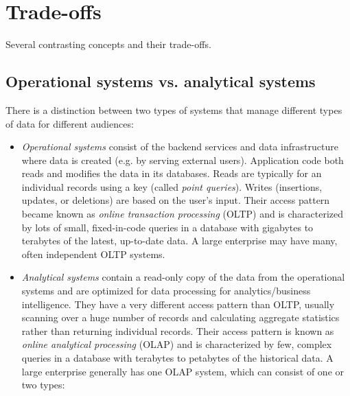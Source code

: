 \documentclass[table, xcdraw]{article}%
\begin{document}
\section{Trade-offs}

Several contrasting concepts and their trade-offs.

\subsection{Operational systems vs. analytical systems}

There is a distinction between two types of systems that manage different types of data for different audiences:
    
\begin{itemize}
    \item \textit{Operational systems} consist of the backend services and data infrastructure where data is created (e.g. by serving external users). Application code both reads and modifies the data in its databases. Reads are typically for an individual records using a key (called \textit{point queries}). Writes (insertions, updates, or deletions) are based on the user's input. Their access pattern became known as \textit{online transaction processing} (OLTP) and is characterized by lots of small, fixed-in-code queries in a database with gigabytes to terabytes of the latest, up-to-date data. A large enterprise may have many, often independent OLTP systems.
    \item \textit{Analytical systems} contain a read-only copy of the data from the operational systems and are optimized for data processing for analytics/business intelligence. They have a very different access pattern than OLTP, usually scanning over a huge number of records and calculating aggregate statistics rather than returning individual records. Their access pattern is known as \textit{online analytical processing} (OLAP) and is characterized by few, complex queries in a database with terabytes to petabytes of the historical data. A large enterprise generally has one OLAP system, which can consist of one or two types:
    \begin{itemize}

\end{itemize}
\end{itemize}
\end{document}
